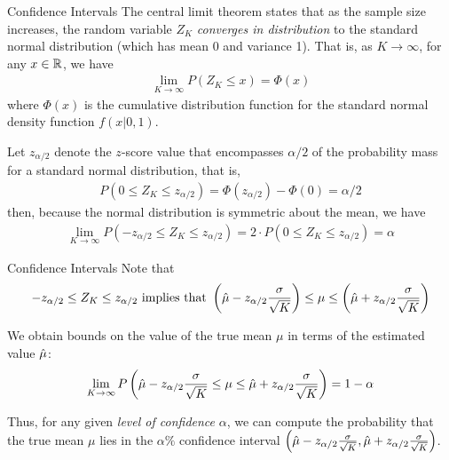 \begin{frame}{Conf\/{i}dence Intervals}
The central limit theorem
states that as the sample size increases, the
random variable $Z_K$ {\em converges in distribution}
to the standard normal
distribution (which has mean 0 and variance 1). That is,
as $K \to \infty$,  for any $x \in {\mathord{\mathbb R}}$, we have
\begin{align*}
\lim_{K\to\infty} P(Z_K \le x) = \Phi(x)
\end{align*}
where $\Phi(x)$ is the cumulative distribution function for the
standard normal density function $f(x| 0,1)$. 

\medskip
Let $z_{\alpha/2}$
denote the $z$-score value that encompasses $\alpha/2$ of the
probability mass for a standard normal distribution, that is,
\begin{align*}
  P(0 \le Z_K \le z_{\alpha/2}) = \Phi(z_{\alpha/2}) - \Phi(0) =
  \alpha/2
\end{align*}
then, because the normal distribution is symmetric about the mean,
we have
\begin{align*}
  \lim_{K\to\infty} P(-z_{\alpha/2} \le Z_K \le z_{\alpha/2}) =
  2 \cdot P(0 \le Z_K \le z_{\alpha/2}) = \alpha
\end{align*}

\end{frame}

\begin{frame}{Conf\/{i}dence Intervals}
Note that
\begin{align*}
  -z_{\alpha/2} \le Z_K \le z_{\alpha/2} 
  \text{ implies that }
  \left(\hat{\mu} - z_{\alpha/2}{\sigma \over \sqrt{K}}\right) \le \mu
  \le \left(\hat{\mu}+z_{\alpha/2}{\sigma \over \sqrt{K}}\right)
\end{align*}

\medskip
We obtain bounds on the value of the true mean $\mu$ in terms of the
estimated value $\hat{\mu}$:
\begin{align*}
  \lim_{K\to\infty} P\left(\hat{\mu} - z_{\alpha/2}{\sigma \over \sqrt{K}} \le \mu \le
  \hat{\mu} + z_{\alpha/2}{\sigma \over \sqrt{K}} \right) = 1-\alpha
\end{align*}

\medskip
Thus, for any given {\em level of conf\/{i}dence} $\alpha$, we can compute
the probability that the true mean $\mu$ lies in the $\alpha\%$
conf\/{i}dence interval $\left(\hat{\mu} - z_{\alpha/2}{\sigma \over
\sqrt{K}}, \hat{\mu} + z_{\alpha/2}{\sigma \over \sqrt{K}}\right)$. 

\end{frame}



